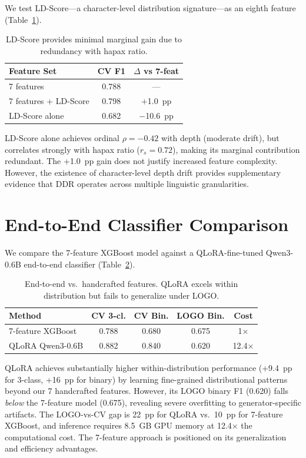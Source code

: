 \documentclass[11pt,a4paper]{article}
\begin{document}
We test LD-Score---a character-level distribution signature---as an eighth feature (Table~\ref{tab:ldscore}).

\begin{table}[h]
\centering
\small
\caption{LD-Score provides minimal marginal gain due to redundancy with hapax ratio.}
\label{tab:ldscore}
\begin{tabular}{lcc}
\toprule
\textbf{Feature Set} & \textbf{CV F1} & \textbf{$\Delta$ vs 7-feat} \\
\midrule
7 features & 0.788 & --- \\
7 features + LD-Score & 0.798 & $+$1.0~pp \\
LD-Score alone & 0.682 & $-$10.6~pp \\
\bottomrule
\end{tabular}
\end{table}

LD-Score alone achieves ordinal $\rho = {-}0.42$ with depth (moderate drift), but correlates strongly with hapax ratio ($r_s = 0.72$), making its marginal contribution redundant.
The +1.0~pp gain does not justify increased feature complexity.
However, the existence of character-level depth drift provides supplementary evidence that DDR operates across multiple linguistic granularities.

\section{End-to-End Classifier Comparison}
\label{app:e2e}

We compare the 7-feature XGBoost model against a QLoRA-fine-tuned Qwen3-0.6B end-to-end classifier (Table~\ref{tab:e2e}).

\begin{table}[h]
\centering
\small
\caption{End-to-end vs.\ handcrafted features. QLoRA excels within distribution but fails to generalize under LOGO.}
\label{tab:e2e}
\begin{tabular}{lcccc}
\toprule
\textbf{Method} & \textbf{CV 3-cl.} & \textbf{CV Bin.} & \textbf{LOGO Bin.} & \textbf{Cost} \\
\midrule
7-feature XGBoost & 0.788 & 0.680 & 0.675 & 1$\times$ \\
QLoRA Qwen3-0.6B & 0.882 & 0.840 & 0.620 & 12.4$\times$ \\
\bottomrule
\end{tabular}
\end{table}

QLoRA achieves substantially higher within-distribution performance (+9.4~pp for 3-class, +16~pp for binary) by learning fine-grained distributional patterns beyond our 7 handcrafted features.
However, its LOGO binary F1 (0.620) falls \emph{below} the 7-feature model (0.675), revealing severe overfitting to generator-specific artifacts.
The LOGO-vs-CV gap is 22~pp for QLoRA vs.\ 10~pp for 7-feature XGBoost, and inference requires 8.5~GB GPU memory at 12.4$\times$ the computational cost.
The 7-feature approach is positioned on its generalization and efficiency advantages.
\end{document}
